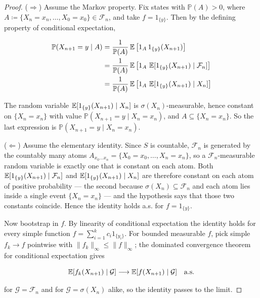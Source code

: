	\begin{proof}
		($\Rightarrow$) Assume the Markov property. Fix states with $\mathbb{P}(A) > 0$, where $A \coloneqq \{X_n = x_n, \ldots, X_0 = x_0\} \in \mathcal{F}_n$, and take $f = 1_{\{y\}}$. Then by the defining property of conditional expectation,

			\begin{align*}
				\mathbb{P}(X_{n+1} = y \mid A) & = \frac{1}{\mathbb{P}(A)} \operatorname{\mathbb{E}}\big[ 1_A \, 1_{\{y\}}(X_{n+1}) \big] \\
				& = \frac{1}{\mathbb{P}(A)} \operatorname{\mathbb{E}}\big[ 1_A \, \operatorname{\mathbb{E}}[ 1_{\{y\}}(X_{n+1}) \mid \mathcal{F}_n] \big] \\
				& = \frac{1}{\mathbb{P}(A)} \operatorname{\mathbb{E}}\big[ 1_A \, \operatorname{\mathbb{E}}[ 1_{\{y\}}(X_{n+1}) \mid X_n] \big]
			\end{align*}

		The random variable $\operatorname{\mathbb{E}}[1_{\{y\}}(X_{n+1}) \mid X_n]$ is $\sigma(X_n)$-measurable, hence constant on $\{X_n = x_n\}$ with value $\mathbb{P}(X_{n+1} = y \mid X_n = x_n)$, and $A \subseteq \{X_n = x_n\}$. So the last expression is $\mathbb{P}(X_{n+1} = y \mid X_n = x_n)$.

		($\Leftarrow$) Assume the elementary identity. Since $S$ is countable, $\mathcal{F}_n$ is generated by the countably many atoms $A_{x_0 \ldots x_n} = \{X_0 = x_0, \ldots, X_n = x_n\}$, so a $\mathcal{F}_n$-measurable random variable is exactly one that is constant on each atom. Both $\operatorname{\mathbb{E}}[1_{\{y\}}(X_{n+1}) \mid \mathcal{F}_n]$ and $\operatorname{\mathbb{E}}[1_{\{y\}}(X_{n+1}) \mid X_n]$ are therefore constant on each atom of positive probability --- the second because $\sigma(X_n) \subseteq \mathcal{F}_n$ and each atom lies inside a single event $\{X_n = x_n\}$ --- and the hypothesis says that those two constants coincide. Hence the identity holds a.s. for $f = 1_{\{y\}}$.

		Now bootstrap in $f$. By linearity of conditional expectation the identity holds for every simple function $f = \sum_{i=1}^k c_i 1_{\{y_i\}}$. For bounded measurable $f$, pick simple $f_k \rightarrow f$ pointwise with $\|f_k\|_\infty \leq \|f\|_\infty$; the dominated convergence theorem for conditional expectation gives

			\begin{equation}
				\operatorname{\mathbb{E}}[f_k (X_{n+1}) \mid \mathcal{G}] \longrightarrow \operatorname{\mathbb{E}}[f(X_{n+1}) \mid \mathcal{G}] \quad \text{a.s.}
			\end{equation}

		for $\mathcal{G} = \mathcal{F}_n$ and for $\mathcal{G} = \sigma(X_n)$ alike, so the identity passes to the limit.


\end{proof}
